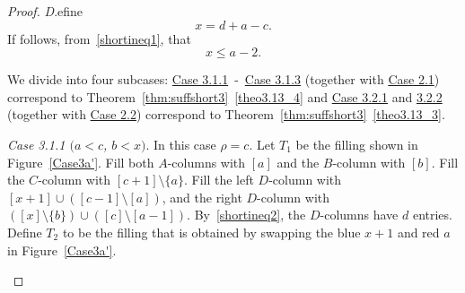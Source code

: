 \documentclass[ALCO,ThmDefs,Unicode,epreuves]{cedram}
\let\hypertargeta\hypertarget %
\let\hyperlinka\hyperlink %
\newenvironment{Case}[1]{\par\vskip2pt\noindent%
\emph{#1}.}{\vskip2pt}
\begin{document}
\begin{proof}
\begin{Case}
Define 
\begin{equation}
\label{shortineq3}
x = d+a-c.
\end{equation} 
If follows, from~\eqref{shortineq1}, that
\begin{equation}
\label{shortineq4}
x\leq a-2.
\end{equation} 

We divide into four subcases: \hyperlinka{theo3.13_case3.1.1}{Case 3.1.1}~-~\hyperlinka{theo3.13_case3.1.3}{Case 3.1.3} (together with \hyperlinka{theo3.13_case2.1}{Case 2.1}) correspond to Theorem~\ref{thm:suffshort3}~\ref{theo3.13_4} and \hyperlinka{theo3.13_case3.2.1}{Case 3.2.1} and \hyperlinka{theo3.13_case3.2.2}{3.2.2} (together with \hyperlinka{theo3.13_case2.2}{Case 2.2}) correspond to Theorem~\ref{thm:suffshort3}~\ref{theo3.13_3}.


\end{Case}

\begin{Case}
{\hypertargeta{theo3.13_case3.1.1}{Case 3.1.1} $(a< c$, $b< x)$} 
In this case $\rho = c$. Let $T_1$ be the filling shown in Figure~\ref{Case3a'}. Fill both $A$-columns with $[a]$ and the $B$-column with $[b]$. Fill the $C$-column with $[c+1]\setminus \{a\}$. Fill the left $D$-column with $[x+1]\cup ([c-1]\setminus [a])$, and the right $D$-column with $([x]\setminus \{b\})\cup ([c]\setminus [a-1])$. By~\eqref{shortineq2}, the $D$-columns have $d$ entries. Define $T_2$ to be the filling that is obtained by swapping the blue $x+1$ and red $a$ in Figure~\ref{Case3a'}.

\begin{figure}[b]\centering
\end{figure}
\end{Case}
\end{proof}
\end{document}

